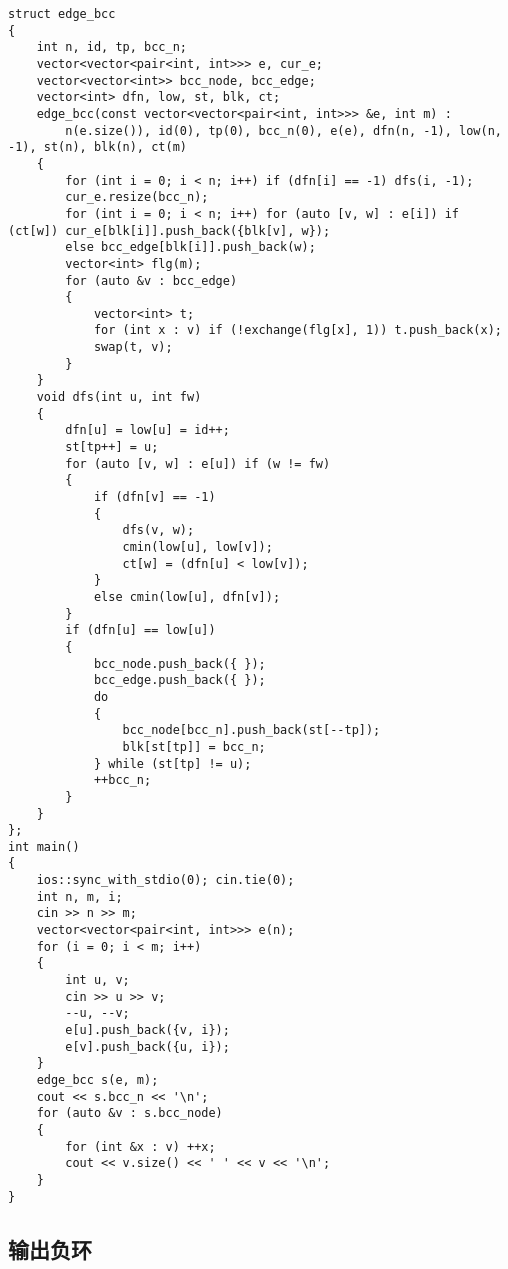 \documentclass[12pt]{ctexart}
\begin{document}
\begin{lstlisting}
struct edge_bcc
{
	int n, id, tp, bcc_n;
	vector<vector<pair<int, int>>> e, cur_e;
	vector<vector<int>> bcc_node, bcc_edge;
	vector<int> dfn, low, st, blk, ct;
	edge_bcc(const vector<vector<pair<int, int>>> &e, int m) :
		n(e.size()), id(0), tp(0), bcc_n(0), e(e), dfn(n, -1), low(n, -1), st(n), blk(n), ct(m)
	{
		for (int i = 0; i < n; i++) if (dfn[i] == -1) dfs(i, -1);
		cur_e.resize(bcc_n);
		for (int i = 0; i < n; i++) for (auto [v, w] : e[i]) if (ct[w]) cur_e[blk[i]].push_back({blk[v], w});
		else bcc_edge[blk[i]].push_back(w);
		vector<int> flg(m);
		for (auto &v : bcc_edge)
		{
			vector<int> t;
			for (int x : v) if (!exchange(flg[x], 1)) t.push_back(x);
			swap(t, v);
		}
	}
	void dfs(int u, int fw)
	{
		dfn[u] = low[u] = id++;
		st[tp++] = u;
		for (auto [v, w] : e[u]) if (w != fw)
		{
			if (dfn[v] == -1)
			{
				dfs(v, w);
				cmin(low[u], low[v]);
				ct[w] = (dfn[u] < low[v]);
			}
			else cmin(low[u], dfn[v]);
		}
		if (dfn[u] == low[u])
		{
			bcc_node.push_back({ });
			bcc_edge.push_back({ });
			do
			{
				bcc_node[bcc_n].push_back(st[--tp]);
				blk[st[tp]] = bcc_n;
			} while (st[tp] != u);
			++bcc_n;
		}
	}
};
int main()
{
	ios::sync_with_stdio(0); cin.tie(0);
	int n, m, i;
	cin >> n >> m;
	vector<vector<pair<int, int>>> e(n);
	for (i = 0; i < m; i++)
	{
		int u, v;
		cin >> u >> v;
		--u, --v;
		e[u].push_back({v, i});
		e[v].push_back({u, i});
	}
	edge_bcc s(e, m);
	cout << s.bcc_n << '\n';
	for (auto &v : s.bcc_node)
	{
		for (int &x : v) ++x;
		cout << v.size() << ' ' << v << '\n';
	}
}
\end{lstlisting}

\subsection{输出负环}
\end{document}
